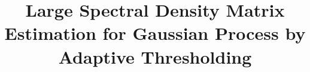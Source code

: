 \documentclass[../main.tex]{subfiles}
\begin{document}
\title{Large Spectral Density Matrix Estimation for Gaussian Process by Adaptive Thresholding}
\author{}
\date{} 
\maketitle




\clearpage 

 

\clearpage 



\clearpage 
\end{document}
